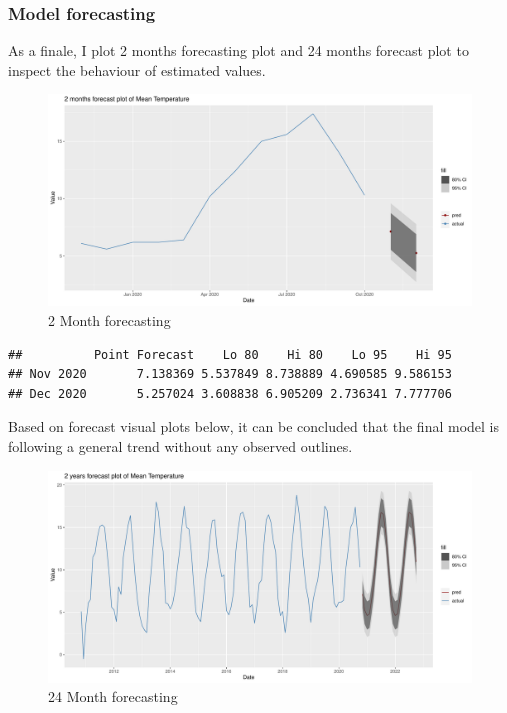 \documentclass[
  11pt,
]{article}
\begin{document}
\newpage

\hypertarget{model-forecasting-2}{%
\subsubsection{Model forecasting}\label{model-forecasting-2}}

As a finale, I plot 2 months forecasting plot and 24 months forecast
plot to inspect the behaviour of estimated values.

\begin{figure}
\centering
\includegraphics{ST422_files/figure-latex/unnamed-chunk-38-1.pdf}
\caption{2 Month forecasting}
\end{figure}

\begin{verbatim}
##          Point Forecast    Lo 80    Hi 80    Lo 95    Hi 95
## Nov 2020       7.138369 5.537849 8.738889 4.690585 9.586153
## Dec 2020       5.257024 3.608838 6.905209 2.736341 7.777706
\end{verbatim}

Based on forecast visual plots below, it can be concluded that the final
model is following a general trend without any observed outlines.

\begin{figure}
\centering
\includegraphics{ST422_files/figure-latex/unnamed-chunk-39-1.pdf}
\caption{24 Month forecasting}
\end{figure}
\end{document}
